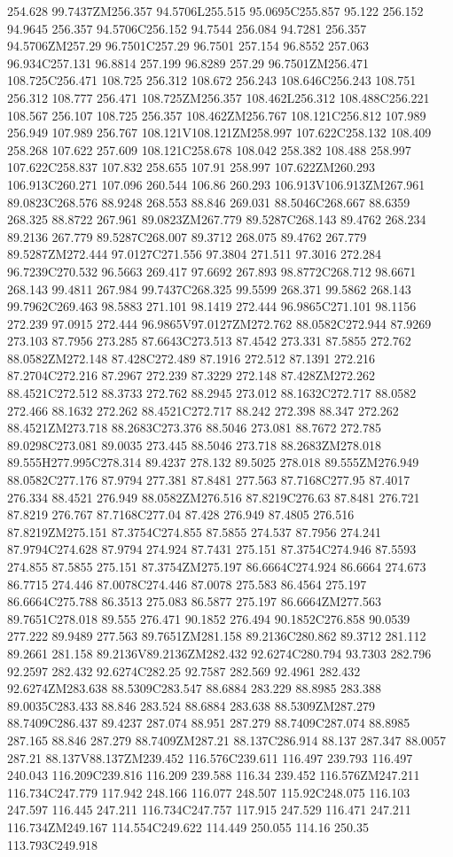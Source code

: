 254.628 99.7437ZM256.357 94.5706L255.515 95.0695C255.857 95.122 256.152 94.9645 256.357 94.5706C256.152 94.7544 256.084 94.7281 256.357 94.5706ZM257.29 96.7501C257.29 96.7501 257.154 96.8552 257.063 96.934C257.131 96.8814 257.199 96.8289 257.29 96.7501ZM256.471 108.725C256.471 108.725 256.312 108.672 256.243 108.646C256.243 108.751 256.312 108.777 256.471 108.725ZM256.357 108.462L256.312 108.488C256.221 108.567 256.107 108.725 256.357 108.462ZM256.767 108.121C256.812 107.989 256.949 107.989 256.767 108.121V108.121ZM258.997 107.622C258.132 108.409 258.268 107.622 257.609 108.121C258.678 108.042 258.382 108.488 258.997 107.622C258.837 107.832 258.655 107.91 258.997 107.622ZM260.293 106.913C260.271 107.096 260.544 106.86 260.293 106.913V106.913ZM267.961 89.0823C268.576 88.9248 268.553 88.846 269.031 88.5046C268.667 88.6359 268.325 88.8722 267.961 89.0823ZM267.779 89.5287C268.143 89.4762 268.234 89.2136 267.779 89.5287C268.007 89.3712 268.075 89.4762 267.779 89.5287ZM272.444 97.0127C271.556 97.3804 271.511 97.3016 272.284 96.7239C270.532 96.5663 269.417 97.6692 267.893 98.8772C268.712 98.6671 268.143 99.4811 267.984 99.7437C268.325 99.5599 268.371 99.5862 268.143 99.7962C269.463 98.5883 271.101 98.1419 272.444 96.9865C271.101 98.1156 272.239 97.0915 272.444 96.9865V97.0127ZM272.762 88.0582C272.944 87.9269 273.103 87.7956 273.285 87.6643C273.513 87.4542 273.331 87.5855 272.762 88.0582ZM272.148 87.428C272.489 87.1916 272.512 87.1391 272.216 87.2704C272.216 87.2967 272.239 87.3229 272.148 87.428ZM272.262 88.4521C272.512 88.3733 272.762 88.2945 273.012 88.1632C272.717 88.0582 272.466 88.1632 272.262 88.4521C272.717 88.242 272.398 88.347 272.262 88.4521ZM273.718 88.2683C273.376 88.5046 273.081 88.7672 272.785 89.0298C273.081 89.0035 273.445 88.5046 273.718 88.2683ZM278.018 89.555H277.995C278.314 89.4237 278.132 89.5025 278.018 89.555ZM276.949 88.0582C277.176 87.9794 277.381 87.8481 277.563 87.7168C277.95 87.4017 276.334 88.4521 276.949 88.0582ZM276.516 87.8219C276.63 87.8481 276.721 87.8219 276.767 87.7168C277.04 87.428 276.949 87.4805 276.516 87.8219ZM275.151 87.3754C274.855 87.5855 274.537 87.7956 274.241 87.9794C274.628 87.9794 274.924 87.7431 275.151 87.3754C274.946 87.5593 274.855 87.5855 275.151 87.3754ZM275.197 86.6664C274.924 86.6664 274.673 86.7715 274.446 87.0078C274.446 87.0078 275.583 86.4564 275.197 86.6664C275.788 86.3513 275.083 86.5877 275.197 86.6664ZM277.563 89.7651C278.018 89.555 276.471 90.1852 276.494 90.1852C276.858 90.0539 277.222 89.9489 277.563 89.7651ZM281.158 89.2136C280.862 89.3712 281.112 89.2661 281.158 89.2136V89.2136ZM282.432 92.6274C280.794 93.7303 282.796 92.2597 282.432 92.6274C282.25 92.7587 282.569 92.4961 282.432 92.6274ZM283.638 88.5309C283.547 88.6884 283.229 88.8985 283.388 89.0035C283.433 88.846 283.524 88.6884 283.638 88.5309ZM287.279 88.7409C286.437 89.4237 287.074 88.951 287.279 88.7409C287.074 88.8985 287.165 88.846 287.279 88.7409ZM287.21 88.137C286.914 88.137 287.347 88.0057 287.21 88.137V88.137ZM239.452 116.576C239.611 116.497 239.793 116.497 240.043 116.209C239.816 116.209 239.588 116.34 239.452 116.576ZM247.211 116.734C247.779 117.942 248.166 116.077 248.507 115.92C248.075 116.103 247.597 116.445 247.211 116.734C247.757 117.915 247.529 116.471 247.211 116.734ZM249.167 114.554C249.622 114.449 250.055 114.16 250.35 113.793C249.918 